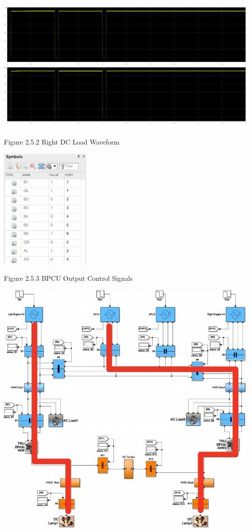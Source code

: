 \documentclass{mcmthesis}
\begin{document}
\includegraphics[trim= 0 0.255\imageheight{} 0 0, clip, width = 0.185\imageheight{}]{gr_ar_load2.png}
\begin{center}
\small{Figure 2.5.2 Right DC Load Waveform}
\end{center}
\begin{center}
\includegraphics[width=4.5cm]{gr_ar_signals.png}
\end{center}
\begin{center}
\small{Figure 2.5.3 BPCU Output Control Signals}
\end{center}
\begin{center}
\includegraphics[width=14.5cm]{gr_ar.png}
\end{center}
\end{document}
